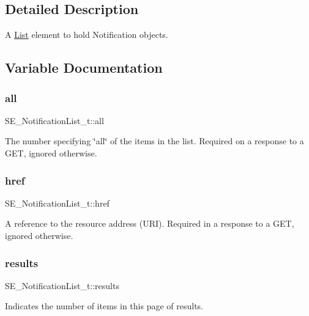 \subsection{Detailed Description}
A \hyperlink{structList}{List} element to hold Notification objects. 

\subsection{Variable Documentation}
\mbox{\label{group__NotificationList_gacdc28bcbd39f7984a6ba52a731267bcc}} 
\subsubsection{\texorpdfstring{all}{all}}
{\footnotesize\ttfamily S\+E\+\_\+\+Notification\+List\+\_\+t\+::all}

The number specifying \char`\"{}all\char`\"{} of the items in the list. Required on a response to a G\+ET, ignored otherwise. \mbox{\label{group__NotificationList_ga04f41cbd1d96801ed0fed7c958e4b5b1}} 
\subsubsection{\texorpdfstring{href}{href}}
{\footnotesize\ttfamily S\+E\+\_\+\+Notification\+List\+\_\+t\+::href}

A reference to the resource address (U\+RI). Required in a response to a G\+ET, ignored otherwise. \mbox{\label{group__NotificationList_ga2a5654da4e99aa6515a308a702b7dee8}} 
\subsubsection{\texorpdfstring{results}{results}}
{\footnotesize\ttfamily S\+E\+\_\+\+Notification\+List\+\_\+t\+::results}

Indicates the number of items in this page of results. 
